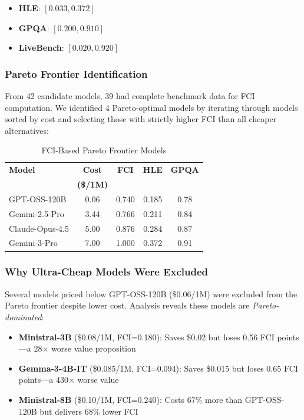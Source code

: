 \begin{itemize}
\item \textbf{HLE}: $[0.033, 0.372]$
\item \textbf{GPQA}: $[0.200, 0.910]$  
\item \textbf{LiveBench}: $[0.020, 0.920]$
\end{itemize}

\subsubsection{Pareto Frontier Identification}

From 42 candidate models, 39 had complete benchmark data for FCI computation. We identified 4 Pareto-optimal models by iterating through models sorted by cost and selecting those with strictly higher FCI than all cheaper alternatives:

\begin{table}[h]
\centering
\caption{FCI-Based Pareto Frontier Models}
\label{tab:pareto_models}
\begin{tabular}{lcccc}
\toprule
\textbf{Model} & \textbf{Cost} & \textbf{FCI} & \textbf{HLE} & \textbf{GPQA} \\
 & \textbf{(\$/1M)} & & & \\
\midrule
GPT-OSS-120B & 0.06 & 0.740 & 0.185 & 0.78 \\
Gemini-2.5-Pro & 3.44 & 0.766 & 0.211 & 0.84 \\
Claude-Opus-4.5 & 5.00 & 0.876 & 0.284 & 0.87 \\
Gemini-3-Pro & 7.00 & 1.000 & 0.372 & 0.91 \\
\bottomrule
\end{tabular}
\end{table}

\subsubsection{Why Ultra-Cheap Models Were Excluded}

Several models priced below GPT-OSS-120B (\$0.06/1M) were excluded from the Pareto frontier despite lower cost. Analysis reveals these models are \textit{Pareto-dominated}:

\begin{itemize}
\item \textbf{Ministral-3B} (\$0.08/1M, FCI=0.180): Saves \$0.02 but loses 0.56 FCI points—a 28$\times$ worse value proposition
\item \textbf{Gemma-3-4B-IT} (\$0.085/1M, FCI=0.094): Saves \$0.015 but loses 0.65 FCI points—a 430$\times$ worse value
\item \textbf{Ministral-8B} (\$0.10/1M, FCI=0.240): Costs 67\% more than GPT-OSS-120B but delivers 68\% lower FCI
\end{itemize}

